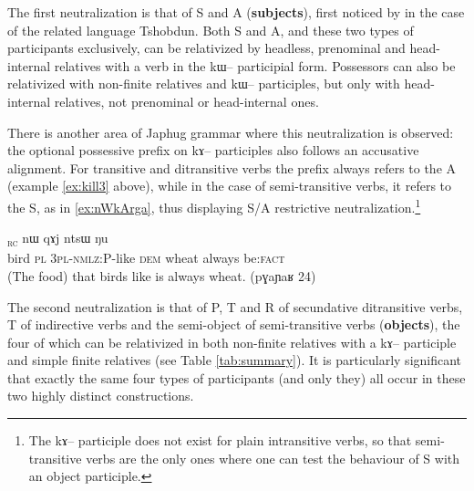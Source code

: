 \documentclass[oldfontcommands,oneside,a4paper,11pt]{article}
\newcommand{\ipa}[1]{{\phon #1}} %
\newcommand{\topic}{\textsc{dem}}
\newcommand{\rc}{\textsubscript{\textsc{rc}}}
\begin{document}
The first neutralization is that of S and A (\textbf{subjects}), first noticed by \citet{jackson03caodeng}  in the case of the related language Tshobdun. Both S and A, and these two types of participants exclusively, can be relativized by headless, prenominal and head-internal relatives with a verb in the \ipa{kɯ--} participial form. Possessors can also be relativized with non-finite relatives and \ipa{kɯ--} participles, but only with head-internal relatives, not prenominal or head-internal ones. 


There is another area  of Japhug grammar where this neutralization is observed: the optional possessive prefix on \ipa{kɤ--} participles also follows an accusative alignment.   For transitive and ditransitive verbs  the prefix always refers to the A (example \ref{ex:kill3} above), while in the case of semi-transitive verbs, it refers to the S, as in \ref{ex:nWkArga}, thus displaying S/A restrictive neutralization.\footnote{The \ipa{kɤ--} participle does not exist for plain intransitive verbs, so that semi-transitive verbs are the only ones where one can test the behaviour of S with an object participle.}

 \begin{exe}
   \ex   \label{ex:nWkArga} 
\gll [\ipa{pɣa}  	\ipa{ra}  	\ipa{nɯ-kɤ-rga}]\rc{}  	\ipa{nɯ}  	\ipa{qɤj}  	\ipa{ntsɯ}  	\ipa{ŋu}  \\
bird \textsc{pl} \textsc{3pl-nmlz:P}-like \topic{} wheat always be:\textsc{fact} \\
\glt (The food) that birds like is always wheat. (\ipa{pɣaɲaʁ} 24)
   \end{exe} 


The second neutralization is that of P, T and R of secundative ditransitive verbs, T of indirective verbs and the semi-object of semi-transitive verbs (\textbf{objects}), the four of which can be relativized in both non-finite relatives with a \ipa{kɤ--} participle and simple finite relatives (see Table \ref{tab:summary}). It is particularly significant that exactly the same four types of participants (and only they) all occur in these two highly distinct constructions.
\end{document}
